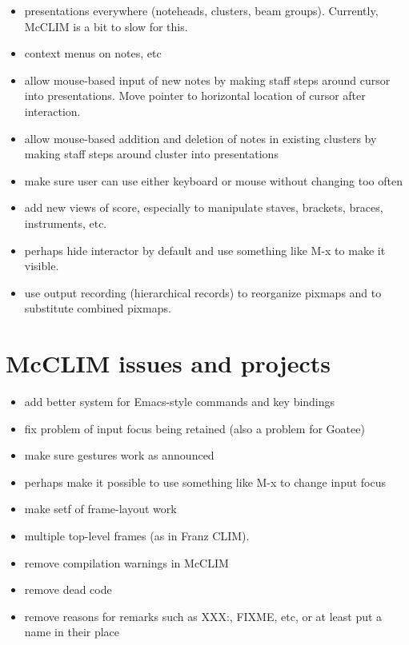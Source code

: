 \begin{itemize}
\item presentations everywhere (noteheads, clusters, beam groups).
  Currently, McCLIM is a bit to slow for this.  
\item context menus on notes, etc
\item allow mouse-based input of new notes by making staff steps
  around cursor into presentations.  Move pointer to horizontal
  location of cursor after interaction.
\item allow mouse-based addition and deletion of notes in existing
  clusters by making staff steps around cluster into presentations
\item make sure user can use either keyboard or mouse without changing
  too often
\item add new views of score, especially to manipulate staves,
  brackets, braces, instruments, etc.
\item perhaps hide interactor by default and use something like M-x to
  make it visible. 
\item use output recording (hierarchical records) to reorganize pixmaps
  and to substitute combined pixmaps. 
\end{itemize}

\section{McCLIM issues and projects}

\begin{itemize}
\item add better system for Emacs-style commands and key
  bindings 
\item fix problem of input focus being retained (also a
  problem for Goatee)
\item make sure gestures work as announced
\item perhaps make it possible to use something like M-x to change
  input focus
\item make setf of frame-layout work
\item multiple top-level frames (as in Franz CLIM).
\item remove compilation warnings in McCLIM
\item remove dead code
\item remove reasons for remarks such as XXX:, FIXME, etc, or at least
  put a name in their place
\end{itemize}
